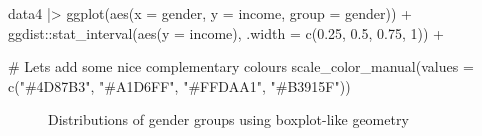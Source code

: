 \documentclass[
  letterpaper,
]{krantz}
\makeatletter
\newenvironment{Shaded}{\begin{snugshade}}{\end{snugshade}}
\newcommand{\AttributeTok}[1]{\textcolor[rgb]{0.40,0.45,0.13}{#1}}
\newcommand{\CommentTok}[1]{\textcolor[rgb]{0.37,0.37,0.37}{#1}}
\newcommand{\DecValTok}[1]{\textcolor[rgb]{0.68,0.00,0.00}{#1}}
\newcommand{\FloatTok}[1]{\textcolor[rgb]{0.68,0.00,0.00}{#1}}
\newcommand{\FunctionTok}[1]{\textcolor[rgb]{0.28,0.35,0.67}{#1}}
\newcommand{\NormalTok}[1]{\textcolor[rgb]{0.00,0.23,0.31}{#1}}
\newcommand{\SpecialCharTok}[1]{\textcolor[rgb]{0.37,0.37,0.37}{#1}}
\newcommand{\StringTok}[1]{\textcolor[rgb]{0.13,0.47,0.30}{#1}}
\newenvironment{kframe}{%
\medskip{}
\setlength{\fboxsep}{.8em}
 \def\at@end@of@kframe{}%
 \ifinner\ifhmode%
  \def\at@end@of@kframe{\end{minipage}}%
  \begin{minipage}{\columnwidth}%
 \fi\fi%
 \def\FrameCommand##1{\hskip\@totalleftmargin \hskip-\fboxsep
 \colorbox{shadecolor}{##1}\hskip-\fboxsep
     \hskip-\linewidth \hskip-\@totalleftmargin \hskip\columnwidth}%
 \MakeFramed {\advance\hsize-\width
   \@totalleftmargin\z@ \linewidth\hsize
   \@setminipage}}%
 {\par\unskip\endMakeFramed%
 \at@end@of@kframe}
\renewenvironment{Shaded}{\begin{kframe}}{\end{kframe}}
\makeatother
\begin{document}
\begin{Shaded}
\begin{Highlighting}[]
\NormalTok{data4 }\SpecialCharTok{|\textgreater{}}
  \FunctionTok{ggplot}\NormalTok{(}\FunctionTok{aes}\NormalTok{(}\AttributeTok{x =}\NormalTok{ gender, }\AttributeTok{y =}\NormalTok{ income, }\AttributeTok{group =}\NormalTok{ gender)) }\SpecialCharTok{+}
\NormalTok{  ggdist}\SpecialCharTok{::}\FunctionTok{stat\_interval}\NormalTok{(}\FunctionTok{aes}\NormalTok{(}\AttributeTok{y =}\NormalTok{ income),}
                        \AttributeTok{.width =} \FunctionTok{c}\NormalTok{(}\FloatTok{0.25}\NormalTok{, }\FloatTok{0.5}\NormalTok{, }\FloatTok{0.75}\NormalTok{, }\DecValTok{1}\NormalTok{)) }\SpecialCharTok{+}

  \CommentTok{\# Let\textquotesingle{}s add some nice complementary colours}
  \FunctionTok{scale\_color\_manual}\NormalTok{(}\AttributeTok{values =} \FunctionTok{c}\NormalTok{(}\StringTok{"\#4D87B3"}\NormalTok{, }\StringTok{"\#A1D6FF"}\NormalTok{,}
                                \StringTok{"\#FFDAA1"}\NormalTok{, }\StringTok{"\#B3915F"}\NormalTok{))}
\end{Highlighting}
\end{Shaded}

\begin{figure}


\caption{\label{fig-homogeneity-variance-alt-vis}Distributions of gender
groups using boxplot-like geometry}

\end{figure}%
\end{document}
